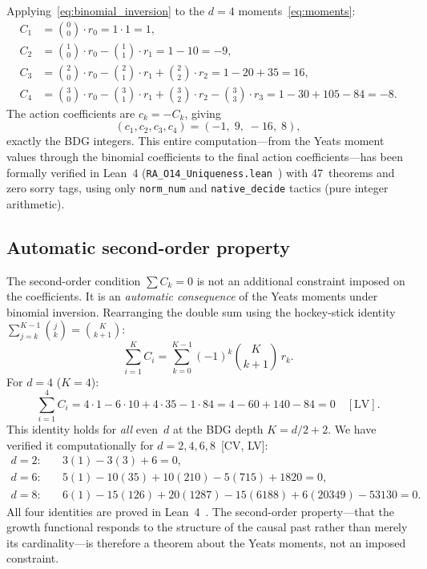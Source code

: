 \documentclass[12pt,a4paper]{article}
\begin{document}
Applying~\eqref{eq:binomial_inversion} to the $d=4$ moments~\eqref{eq:moments}:
\begin{align}
C_1 &= \binom{0}{0}\cdot r_0 = 1 \cdot 1 = 1, \label{eq:C1}\\[4pt]
C_2 &= \binom{1}{0}\cdot r_0 - \binom{1}{1}\cdot r_1 = 1 - 10 = -9, \label{eq:C2}\\[4pt]
C_3 &= \binom{2}{0}\cdot r_0 - \binom{2}{1}\cdot r_1 + \binom{2}{2}\cdot r_2 = 1 - 20 + 35 = 16, \label{eq:C3}\\[4pt]
C_4 &= \binom{3}{0}\cdot r_0 - \binom{3}{1}\cdot r_1 + \binom{3}{2}\cdot r_2 - \binom{3}{3}\cdot r_3 = 1 - 30 + 105 - 84 = -8. \label{eq:C4}
\end{align}
The action coefficients are $c_k = -C_k$, giving
\begin{equation}
\boxed{(c_1,c_2,c_3,c_4) = (-1,\; 9,\; -16,\; 8),}
\label{eq:bdg_coeffs}
\end{equation}
exactly the BDG integers. This entire computation---from the Yeats moment values through the binomial coefficients to the final action coefficients---has been formally verified in Lean~4 (\texttt{RA\_O14\_Uniqueness.lean}~\cite{O14Lean}) with 47~theorems and zero sorry tags, using only \texttt{norm\_num} and \texttt{native\_decide} tactics (pure integer arithmetic).

\subsection{Automatic second-order property}\label{sec:second_order}

The second-order condition $\sum C_k = 0$ is not an additional constraint imposed on the coefficients. It is an \emph{automatic consequence} of the Yeats moments under binomial inversion. Rearranging the double sum using the hockey-stick identity $\sum_{j=k}^{K-1}\binom{j}{k} = \binom{K}{k+1}$:
\begin{equation}
\sum_{i=1}^{K} C_i = \sum_{k=0}^{K-1}(-1)^k\binom{K}{k+1}\,r_k.
\label{eq:hockey_rearrange}
\end{equation}
For $d=4$ ($K=4$):
\begin{equation}
\sum_{i=1}^{4}C_i = 4 \cdot 1 - 6 \cdot 10 + 4 \cdot 35 - 1 \cdot 84 = 4 - 60 + 140 - 84 = 0 \quad[\text{LV}].
\label{eq:second_order_d4}
\end{equation}
This identity holds for \emph{all} even~$d$ at the BDG depth $K = d/2+2$. We have verified it computationally for $d = 2, 4, 6, 8$~[CV, LV]:
\begin{align}
d=2: \quad & 3(1) - 3(3) + 6 = 0, \\
d=6: \quad & 5(1) - 10(35) + 10(210) - 5(715) + 1820 = 0, \\
d=8: \quad & 6(1) - 15(126) + 20(1287) - 15(6188) + 6(20349) - 53130 = 0.
\end{align}
All four identities are proved in Lean~4~\cite{O14Lean}. The second-order property---that the growth functional responds to the structure of the causal past rather than merely its cardinality---is therefore a theorem about the Yeats moments, not an imposed constraint.
\end{document}
